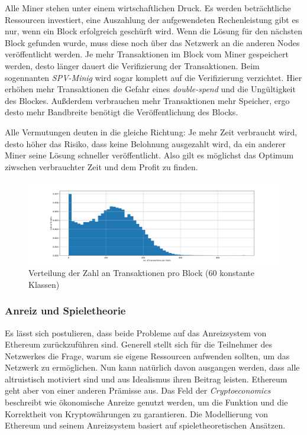 \documentclass[runningheads]{llncs}
\begin{document}
Alle Miner stehen unter einem wirtschaftlichen Druck. Es werden beträchtliche Ressourcen investiert, eine Auszahlung der aufgewendeten Rechenleistung gibt es nur, wenn ein Block erfolgreich geschürft wird. Wenn die Lösung für den nächsten Block gefunden wurde, muss diese noch über das Netzwerk an die anderen Nodes veröffentlicht werden. Je mehr Transaktionen im Block vom Miner gespeichert werden, desto länger dauert die Verifizierung der Transaktionen. Beim sogennanten \textit{SPV-Minig} wird sogar komplett auf die Verifizierung verzichtet. \cite{svanevik_why_2018} Hier erhöhen mehr Transaktionen die Gefahr eines \textit{double-spend} und die Ungültigkeit des Blockes. Außderdem verbrauchen mehr Transaktionen mehr Speicher, ergo desto mehr Bandbreite benötigt die Veröffentlichung des Blocks. \cite{research_empty_nodate}

Alle Vermutungen deuten in die gleiche Richtung: Je mehr Zeit verbraucht wird, desto höher das Risiko, dass keine Belohnung ausgezahlt wird, da ein anderer Miner seine Lösung schneller veröffentlicht. Also gilt es möglichst das Optimum ziwschen verbrauchter Zeit und dem Profit zu finden.

\begin{figure}[h!]
  \centerline{\includegraphics[width=\textwidth, keepaspectratio]{blocks_transactions_per_block.png}}
  \caption{Verteilung der Zahl an Transaktionen pro Block (60 konstante Klassen) \cite{neemann_appendix_nodate}}
  \label{blocks_transactions_per_block}
\end{figure}

\subsubsection{Anreiz und Spieletheorie}
Es lässt sich postulieren, dass beide Probleme auf das Anreizsystem von Ethereum zurückzuführen sind. Generell stellt sich für die Teilnehmer des Netzwerkes die Frage, warum sie eigene Ressourcen aufwenden sollten, um das Netzwerk zu ermöglichen. Nun kann natürlich davon ausgangen werden, dass alle altruistisch motiviert sind und aus Idealismus ihren Beitrag leisten. Ethereum geht aber von einer anderen Prämisse aus. Das Feld der \textit{Cryptoeconomics} beschreibt wie ökonomische Anreize genutzt werden, um die Funktion und die Korrektheit von Kryptowährungen zu garantieren. Die Modellierung von Ethereum und seinem Anreizsystem basiert auf spieletheoretischen Ansätzen. \cite{noauthor_cryptoeconomics_nodate}
\end{document}

